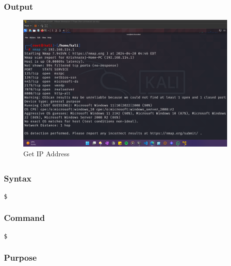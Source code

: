 \documentclass[11pt]{article}
\begin{document}
\subsubsection*{Output}
\begin{figure}[H]
    \centering
    \includegraphics[width=0.99\textwidth]{a3_ss .png}
    \caption{Get IP Address}
    \label{fig:1}
\end{figure}

\subsection{}

\subsubsection*{Syntax}
\begin{verbatim}
$
\end{verbatim}

\subsubsection*{Command}
\begin{verbatim}
$
\end{verbatim}

\subsubsection*{Purpose}
\end{document}
